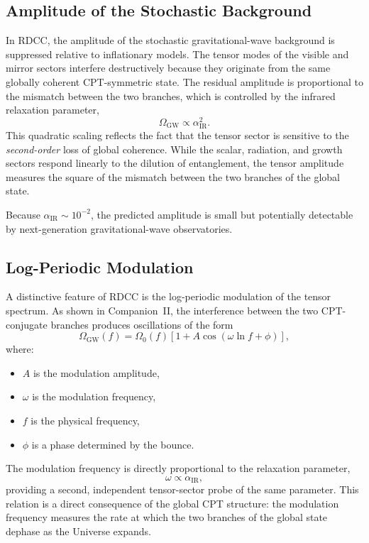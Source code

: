 \documentclass[11pt,a4paper]{article}
\begin{document}
\subsection{Amplitude of the Stochastic Background}

In RDCC, the amplitude of the stochastic gravitational-wave background is suppressed relative
to inflationary models. The tensor modes of the visible and mirror sectors interfere destructively
because they originate from the same globally coherent CPT-symmetric state. The residual
amplitude is proportional to the mismatch between the two branches, which is controlled by the
infrared relaxation parameter,
\begin{equation}
    \Omega_{\mathrm{GW}} \propto \alpha_{\mathrm{IR}}^2.
\end{equation}
This quadratic scaling reflects the fact that the tensor sector is sensitive to the \emph{second-order}
loss of global coherence. While the scalar, radiation, and growth sectors respond linearly to the
dilution of entanglement, the tensor amplitude measures the square of the mismatch between the
two branches of the global state.

Because $\alpha_{\mathrm{IR}} \sim 10^{-2}$, the predicted amplitude is small but potentially detectable
by next-generation gravitational-wave observatories.

\subsection{Log-Periodic Modulation}

A distinctive feature of RDCC is the log-periodic modulation of the tensor spectrum. As shown
in Companion~II, the interference between the two CPT-conjugate branches produces oscillations
of the form
\begin{equation}
    \Omega_{\mathrm{GW}}(f)
    = \Omega_0(f)\left[1 + A\cos\!\left(\omega\ln f + \phi\right)\right],
\end{equation}
where:
\begin{itemize}
    \item $A$ is the modulation amplitude,
    \item $\omega$ is the modulation frequency,
    \item $f$ is the physical frequency,
    \item $\phi$ is a phase determined by the bounce.
\end{itemize}

The modulation frequency is directly proportional to the relaxation parameter,
\begin{equation}
    \omega \propto \alpha_{\mathrm{IR}},
\end{equation}
providing a second, independent tensor-sector probe of the same parameter. This relation is a
direct consequence of the global CPT structure: the modulation frequency measures the rate at
which the two branches of the global state dephase as the Universe expands.
\end{document}
